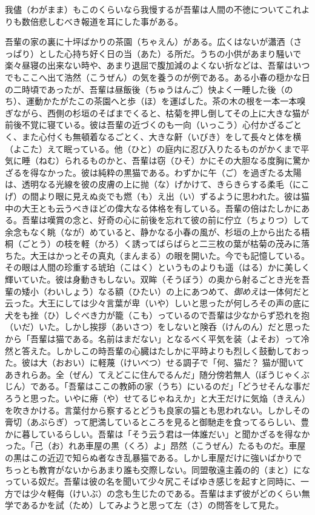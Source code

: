 \documentclass{book}
\begin{document}
我儘（わがまま）もこのくらいなら我慢するが吾輩は人間の不徳についてこれよりも数倍悲しむべき報道を耳にした事がある。

吾輩の家の裏に十坪ばかりの茶園（ちゃえん）がある。広くはないが瀟洒（さっぱり）とした心持ち好く日の当（あた）る所だ。うちの小供があまり騒いで楽々昼寝の出来ない時や、あまり退屈で腹加減のよくない折などは、吾輩はいつでもここへ出て浩然（こうぜん）の気を養うのが例である。ある小春の穏かな日の二時頃であったが、吾輩は昼飯後（ちゅうはんご）快よく一睡した後（のち）、運動かたがたこの茶園へと歩（ほ）を運ばした。茶の木の根を一本一本嗅ぎながら、西側の杉垣のそばまでくると、枯菊を押し倒してその上に大きな猫が前後不覚に寝ている。彼は吾輩の近づくのも一向（いっこう）心付かざるごとく、また心付くも無頓着なるごとく、大きな鼾（いびき）をして長々と体を横（よこた）えて眠っている。他（ひと）の庭内に忍び入りたるものがかくまで平気に睡（ねむ）られるものかと、吾輩は窃（ひそ）かにその大胆なる度胸に驚かざるを得なかった。彼は純粋の黒猫である。わずかに午（ご）を過ぎたる太陽は、透明なる光線を彼の皮膚の上に抛（な）げかけて、きらきらする柔毛（にこげ）の間より眼に見えぬ炎でも燃（も）え出（い）ずるように思われた。彼は猫中の大王とも云うべきほどの偉大なる体格を有している。吾輩の倍はたしかにある。吾輩は嘆賞の念と、好奇の心に前後を忘れて彼の前に佇立（ちょりつ）して余念もなく眺（なが）めていると、静かなる小春の風が、杉垣の上から出たる梧桐（ごとう）の枝を軽（かろ）く誘ってばらばらと二三枚の葉が枯菊の茂みに落ちた。大王はかっとその真丸（まんまる）の眼を開いた。今でも記憶している。その眼は人間の珍重する琥珀（こはく）というものよりも遥（はる）かに美しく輝いていた。彼は身動きもしない。双眸（そうぼう）の奥から射るごとき光を吾輩の矮小（わいしょう）なる額（ひたい）の上にあつめて、\emph{御めえ}は一体何だと云った。大王にしては少々言葉が卑（いや）しいと思ったが何しろその声の底に犬をも挫（ひ）しぐべき力が籠（こも）っているので吾輩は少なからず恐れを抱（いだ）いた。しかし挨拶（あいさつ）をしないと険呑（けんのん）だと思ったから「吾輩は猫である。名前はまだない」となるべく平気を装（よそお）って冷然と答えた。しかしこの時吾輩の心臓はたしかに平時よりも烈しく鼓動しておった。彼は大（おおい）に軽蔑（けいべつ）せる調子で「何、猫だ？ 猫が聞いてあきれらあ。全（ぜん）てえどこに住んでるんだ」随分傍若無人（ぼうじゃくぶじん）である。「吾輩はここの教師の家（うち）にいるのだ」「どうせそんな事だろうと思った。いやに瘠（や）せてるじゃねえか」と大王だけに気焔（きえん）を吹きかける。言葉付から察するとどうも良家の猫とも思われない。しかしその膏切（あぶらぎ）って肥満しているところを見ると御馳走を食ってるらしい、豊かに暮しているらしい。吾輩は「そう云う君は一体誰だい」と聞かざるを得なかった。「己（お）れあ車屋の黒（くろ）よ」昂然（こうぜん）たるものだ。車屋の黒はこの近辺で知らぬ者なき乱暴猫である。しかし車屋だけに強いばかりでちっとも教育がないからあまり誰も交際しない。同盟敬遠主義の的（まと）になっている奴だ。吾輩は彼の名を聞いて少々尻こそばゆき感じを起すと同時に、一方では少々軽侮（けいぶ）の念も生じたのである。吾輩はまず彼がどのくらい無学であるかを試（ため）してみようと思って左（さ）の問答をして見た。
\end{document}
